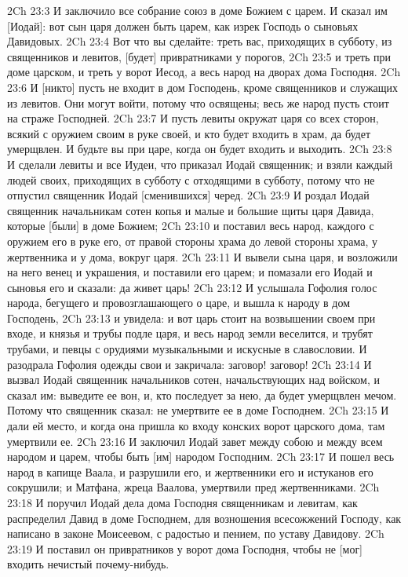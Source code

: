2Ch 23:3  И заключило все собрание союз в доме Божием с царем. И сказал им [Иодай]: вот сын царя должен быть царем, как изрек Господь о сыновьях Давидовых.
2Ch 23:4  Вот что вы сделайте: треть вас, приходящих в субботу, из священников и левитов, [будет] привратниками у порогов,
2Ch 23:5  и треть при доме царском, и треть у ворот Иесод, а весь народ на дворах дома Господня.
2Ch 23:6  И [никто] пусть не входит в дом Господень, кроме священников и служащих из левитов. Они могут войти, потому что освящены; весь же народ пусть стоит на страже Господней.
2Ch 23:7  И пусть левиты окружат царя со всех сторон, всякий с оружием своим в руке своей, и кто будет входить в храм, да будет умерщвлен. И будьте вы при царе, когда он будет входить и выходить.
2Ch 23:8  И сделали левиты и все Иудеи, что приказал Иодай священник; и взяли каждый людей своих, приходящих в субботу с отходящими в субботу, потому что не отпустил священник Иодай [сменившихся] черед.
2Ch 23:9  И роздал Иодай священник начальникам сотен копья и малые и большие щиты царя Давида, которые [были] в доме Божием;
2Ch 23:10  и поставил весь народ, каждого с оружием его в руке его, от правой стороны храма до левой стороны храма, у жертвенника и у дома, вокруг царя.
2Ch 23:11  И вывели сына царя, и возложили на него венец и украшения, и поставили его царем; и помазали его Иодай и сыновья его и сказали: да живет царь!
2Ch 23:12  И услышала Гофолия голос народа, бегущего и провозглашающего о царе, и вышла к народу в дом Господень,
2Ch 23:13  и увидела: и вот царь стоит на возвышении своем при входе, и князья и трубы подле царя, и весь народ земли веселится, и трубят трубами, и певцы с орудиями музыкальными и искусные в славословии. И разодрала Гофолия одежды свои и закричала: заговор! заговор!
2Ch 23:14  И вызвал Иодай священник начальников сотен, начальствующих над войском, и сказал им: выведите ее вон, и, кто последует за нею, да будет умерщвлен мечом. Потому что священник сказал: не умертвите ее в доме Господнем.
2Ch 23:15  И дали ей место, и когда она пришла ко входу конских ворот царского дома, там умертвили ее.
2Ch 23:16  И заключил Иодай завет между собою и между всем народом и царем, чтобы быть [им] народом Господним.
2Ch 23:17  И пошел весь народ в капище Ваала, и разрушили его, и жертвенники его и истуканов его сокрушили; и Матфана, жреца Ваалова, умертвили пред жертвенниками.
2Ch 23:18  И поручил Иодай дела дома Господня священникам и левитам, как распределил Давид в доме Господнем, для возношения всесожжений Господу, как написано в законе Моисеевом, с радостью и пением, по уставу Давидову.
2Ch 23:19  И поставил он привратников у ворот дома Господня, чтобы не [мог] входить нечистый почему-нибудь.
